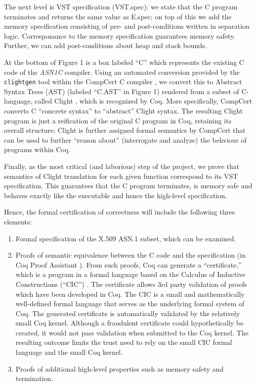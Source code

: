 \documentclass[10p,conference]{IEEEtran}
\begin{document}
The next level is VST specification (VST.spec): we state that the C program terminates and returns the same value as E.spec; on top of this we add the memory specification consisting of pre- and post-conditions written in separation logic. Corresponance to the memory specification guarantees memory safety. Further, we can add post-conditions about heap and stack bounds. 

At the bottom of Figure 1 is a box labeled ``C'' which represents the
existing C code of the \emph{ASN1C} compiler. Using an automated conversion
provided by the \texttt{clightgen} tool within the CompCert C compiler
\cite{CompCert}, we convert this to Abstract Syntax Trees (AST)
\cite{AST} (labeled ``C.AST'' in Figure 1) rendered from a subset
of C-language, called Clight \cite{Mechanized}, which is recognized by Coq. More specifically,
CompCert converts C ``concrete syntax'' to ``abstract'' Clight
syntax. The resulting Clight program is just a reification of the
original C program in Coq, retaining its overall structure; Clight is further assigned formal semantics
by CompCert that can be used to further ``reason about'' (interrogate
and analyze) the behviour of programs within Coq.

Finally, as the most critical (and laborious) step of the project, we
prove that semantics of Clight
translation for each given function correspond to its VST specification. This guarantees that the C program terminates, is memory safe and behaves exactly like the executable and hence the high-level specification.

Hence, the formal certification of correctness will include the following
three elements:

\begin{enumerate}[label=(\alph*)]

\item Formal specification of the X.509 ASN.1 subset, which can be examined.

\item Proofs of semantic equivalence between the C code and the
  specification (in Coq Proof Assistant \cite{Coq}). From such
  proofs, Coq can generate a ``certificate,'' which is a program in a
  formal language based on the Calculus of Inductive Constructions
  (``CIC'') \cite{CIC}. The certificate allows 3rd party
  validation of proofs which have been developed in Coq. The CIC is a small and mathematically
  well-defined formal language that serves as the underlying formal
  system of Coq. The generated certificate is automatically validated
  by the relatively small Coq kernel. Although a fraudulent
  certificate could hypothetically be created, it would not pass
  validation when submitted to the Coq kernel. The resulting outcome
  limits the trust need to rely on the small CIC formal language and
  the small Coq kernel.

\item Proofs of additional high-level properties such as memory safety
  and termination.

\end{enumerate}
  
\end{document}
